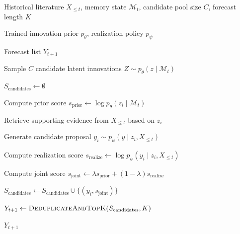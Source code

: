 \documentclass{article} %
\begin{document}
\begin{algorithm}[t]

\caption{Joint Inference Procedure for Idea Forecasting}

\label{alg:inference}

\begin{algorithmic}[1]

\Require Historical literature $X_{\le t}$, memory state $\mathcal{M}_t$, candidate pool size $C$, forecast length $K$

\Require Trained innovation prior $p_\theta$, realization policy $p_\psi$

\Ensure Forecast list $Y_{t+1}$

\State Sample $C$ candidate latent innovations $Z \sim p_\theta(z \mid \mathcal{M}_t)$

\State $S_{\text{candidates}} \gets \emptyset$


\State Compute prior score $s_{\text{prior}} \gets \log p_\theta(z_i \mid \mathcal{M}_t)$

\State Retrieve supporting evidence from $X_{\le t}$ based on $z_i$

\State Generate candidate proposal $y_i \sim p_\psi(y \mid z_i, X_{\le t})$

\State Compute realization score $s_{\text{realize}} \gets \log p_\psi(y_i \mid z_i, X_{\le t})$

\State Compute joint score $s_{\text{joint}} \gets \lambda s_{\text{prior}} + (1-\lambda) s_{\text{realize}}$

\State $S_{\text{candidates}} \gets S_{\text{candidates}} \cup \{(y_i, s_{\text{joint}})\}$

\EndFor

\State $Y_{t+1} \gets \textsc{DeduplicateAndTopK}(S_{\text{candidates}}, K)$

\State \Return $Y_{t+1}$

\end{algorithmic}

\end{algorithm}


\end{document}
